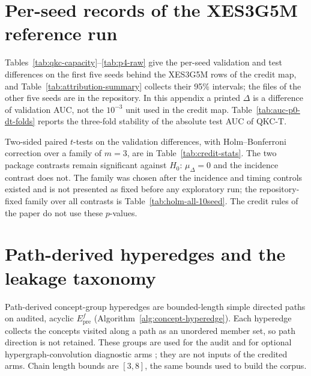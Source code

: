 \documentclass[review,12pt]{elsarticle}
\begin{document}



\FloatBarrier

\section{Per-seed records of the XES3G5M reference run}
\label{app:reference-run}
Tables~\ref{tab:qkc-capacity}--\ref{tab:p4-raw} give the per-seed
validation and test differences on the first five seeds behind the
XES3G5M rows of the credit map, and Table~\ref{tab:attribution-summary}
collects their 95\% intervals; the files of the other five seeds are in
the repository. In this appendix a printed $\Delta$ is a difference of
validation AUC, not the $10^{-3}$ unit used in the credit map.
Table~\ref{tab:auc-p0-dt-folds} reports the three-fold
stability of the absolute test AUC of QKC-T.










Two-sided paired $t$-tests on the validation differences, with
Holm--Bonferroni correction over a family of $m{=}3$, are in
Table~\ref{tab:credit-stats}. The two package contrasts remain
significant against $H_0{:}\,\mu_\Delta=0$ and the incidence contrast
does not. The family was chosen after the incidence and timing controls
existed and is not presented as fixed before any exploratory run; the
repository-fixed family over all contrasts is
Table~\ref{tab:holm-all-10seed}. The credit rules of the paper do not
use these $p$-values.

\section{Path-derived hyperedges and the leakage taxonomy}
\label{app:hyperedge-construction}
\label{sec:tier1-graph}
Path-derived concept-group hyperedges are bounded-length simple directed
paths on audited, acyclic $E_{\mathrm{pre}}^f$
(Algorithm~\ref{alg:concept-hyperedge}). Each hyperedge collects the
concepts visited along a path as an unordered member set, so path
direction is not retained. These groups are used for the audit and for
optional hypergraph-convolution diagnostic arms
\cite{bai2021hypergraphconv}; they are not inputs of the credited arms.
Chain length bounds are $[3,8]$, the same bounds used to build the corpus.
\end{document}
